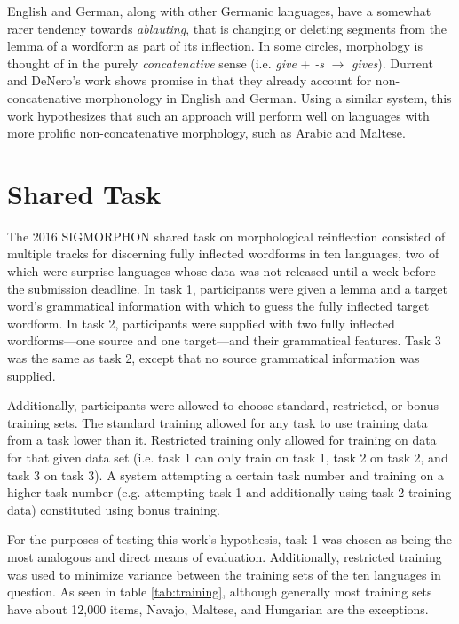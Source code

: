 \documentclass[11pt]{article}
\begin{document}
English and German, along with other Germanic languages, have a somewhat rarer tendency towards \emph{ablauting}, that is changing or deleting segments from the lemma of a wordform as part of its inflection.
In some circles, morphology is thought of in the purely \emph{concatenative} sense (i.e. \emph{give} + \emph{-s} $\to$ \emph{gives}).
Durrent and DeNero's work shows promise in that they already account for non-concatenative morphonology in English and German.
Using a similar system, this work hypothesizes that such an approach will perform well on languages with more prolific non-concatenative morphology, such as Arabic and Maltese. 
 
\section*{Shared Task}
The 2016 SIGMORPHON \cite{cotterell-sigmorphon2016} shared task on morphological reinflection consisted of multiple tracks for discerning fully inflected wordforms in ten languages, two of which were surprise languages whose data was not released until a week before the submission deadline.
In task 1, participants were given a lemma and a target word's grammatical information with which to guess the fully inflected target wordform.
In task 2, participants were supplied with two fully inflected wordforms---one source and one target---and their grammatical features.
Task 3 was the same as task 2, except that no source grammatical information was supplied. 

Additionally, participants were allowed to choose standard, restricted, or bonus training sets. 
The standard training allowed for any task to use training data from a task lower than it. 
Restricted training only allowed for training on data for that given data set (i.e. task 1 can only train on task 1, task 2 on task 2, and task 3 on task 3).
A system attempting a certain task number and training on a higher task number (e.g. attempting task 1 and additionally using task 2 training data) constituted using bonus training.

For the purposes of testing this work's hypothesis, task 1 was chosen as being the most analogous and direct means of evaluation.
Additionally, restricted training was used to minimize variance between the training sets of the ten languages in question. 
As seen in table \ref{tab:training}, although generally most training sets have about 12,000 items, Navajo, Maltese, and Hungarian are the exceptions.
\end{document}
